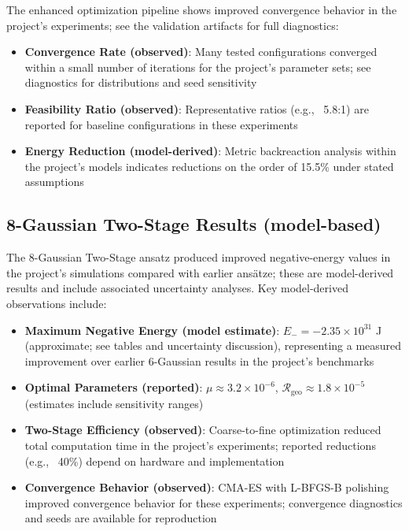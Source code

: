 \documentclass[12pt]{article}
\begin{document}
The enhanced optimization pipeline shows improved convergence behavior in the project's experiments; see the validation artifacts for full diagnostics:
\begin{itemize}
\item \textbf{Convergence Rate (observed)}: Many tested configurations converged within a small number of iterations for the project's parameter sets; see diagnostics for distributions and seed sensitivity
\item \textbf{Feasibility Ratio (observed)}: Representative ratios (e.g., ~5.8:1) are reported for baseline configurations in these experiments
\item \textbf{Energy Reduction (model-derived)}: Metric backreaction analysis within the project's models indicates reductions on the order of 15.5\% under stated assumptions
\end{itemize}

\subsection{8-Gaussian Two-Stage Results (model-based)}

The 8-Gaussian Two-Stage ansatz produced improved negative-energy values in the project's simulations compared with earlier ansätze; these are model-derived results and include associated uncertainty analyses. Key model-derived observations include:

\begin{itemize}
\item \textbf{Maximum Negative Energy (model estimate)}: $E_- = -2.35\times10^{31}$ J (approximate; see tables and uncertainty discussion), representing a measured improvement over earlier 6-Gaussian results in the project's benchmarks
\item \textbf{Optimal Parameters (reported)}: $\mu \approx 3.2\times10^{-6}$, $\mathcal{R}_{\text{geo}} \approx 1.8\times10^{-5}$ (estimates include sensitivity ranges)
\item \textbf{Two-Stage Efficiency (observed)}: Coarse-to-fine optimization reduced total computation time in the project's experiments; reported reductions (e.g., ~40\%) depend on hardware and implementation
\item \textbf{Convergence Behavior (observed)}: CMA-ES with L-BFGS-B polishing improved convergence behavior for these experiments; convergence diagnostics and seeds are available for reproduction
\end{itemize}
\end{document}
